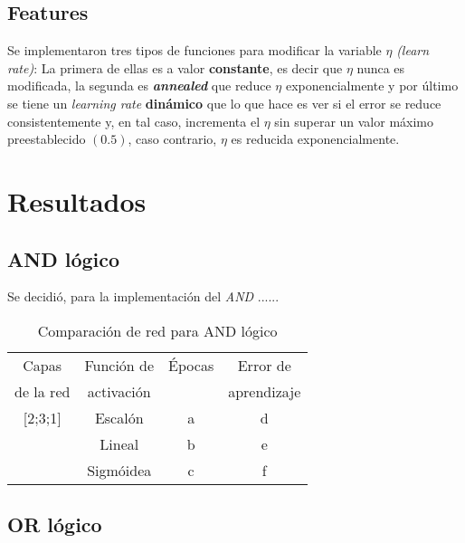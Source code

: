 \documentclass[%
    final,
    reprint,
    notitlepage,
    narroweqnarray,
    inline,
    twoside,
    invited
    ]{ieee}
\begin{document}
\subsection{Features}

\par Se implementaron tres tipos de funciones para modificar la variable $\eta$ \textit{(learn rate)}: La primera de ellas es a valor \textbf{constante}, es decir que $\eta$ nunca es modificada, la segunda es \textbf{\textit{annealed}} que reduce $\eta$ exponencialmente y por último se tiene un \textit{learning rate} \textbf{dinámico} que lo que hace es ver si el error se reduce consistentemente y, en tal caso, incrementa el $\eta$ sin superar un valor máximo preestablecido $(0.5)$, caso contrario, $\eta$ es reducida exponencialmente.

\section{Resultados}

\subsection{AND lógico}

\par Se decidió, para la implementación del \textit{AND} ......

\begin{table}[H]
\begin{center}
\begin{tabular}{|c|c|c|c|}
\hline
  Capas & Función de &  Épocas & Error de\\
 de la red & activación &  & aprendizaje\\

\hline
\hline

[2;3;1] & Escalón & a & d\\
\hline
[2;3;1] & Lineal & b & e\\
\hline
[2;3;1] & Sigmóidea & c & f\\
\hline

\end{tabular}
\end{center}
\caption{Comparación de red para AND lógico}\label{tablaIDFS}
\end{table}

\subsection{OR lógico}
\end{document}
